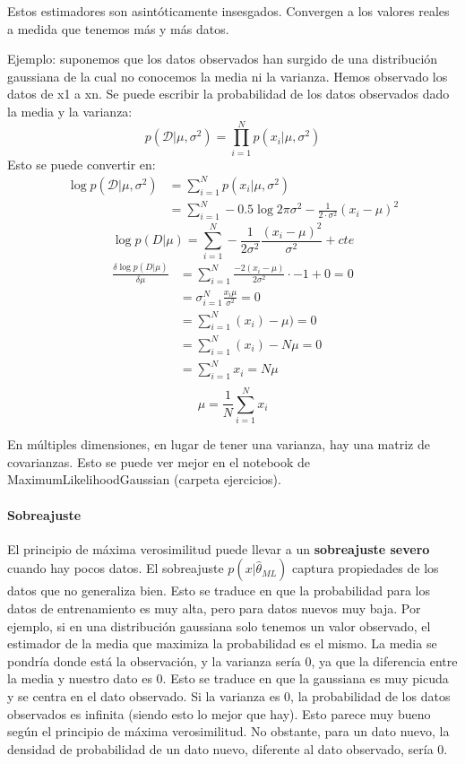 Estos estimadores son asintóticamente insesgados. Convergen a los valores reales a medida que tenemos más y más datos.

Ejemplo: suponemos que los datos observados han surgido de una distribución gaussiana de la cual no conocemos la media ni la varianza. Hemos observado los datos de x1 a xn. Se puede escribir la probabilidad de los datos observados dado la media y la varianza: 
$$p(\mathcal{D} | \mu, \sigma^2) = \prod^N_{i = 1} p(x_i | \mu, \sigma^2)$$
Esto se puede convertir en:
\begin{align*}
\log p(\mathcal{D} | \mu, \sigma^2) &= \sum^N_{i = 1} p(x_i | \mu, \sigma^2) \\
&= \sum^N_{i = 1} -0.5 \log 2 \pi \sigma^2 - \frac{1}{2 \cdot \sigma^2} (x_i - \mu)^2
\end{align*}
$$\log p(D|\mu) = \sum^N_{i = 1} - \frac{1}{2 \sigma^2} \frac{(x_i - \mu)^2}{\sigma^2} + cte$$
\begin{align*}
\frac{\delta \log p(D|\mu)}{\delta \mu} &= \sum^N_{i=1} \frac{-2(x_i - \mu)}{2 \sigma^2} \cdot -1 + 0 = 0 \\
&= \sigma^N_{i=1} \frac{x_i  \mu}{\sigma^2} = 0 \\
&= \sum^N_{i=1} (x_i) - \mu) = 0 \\
&= \sum^N_{i=1}(x_i) - N \mu = 0 \\
&= \sum^N_{i = 1} x_i = N \mu \\
\end{align*}
$$\mu = \frac{1}{N} \sum^N_{i=1} x_i$$

En múltiples dimensiones, en lugar de tener una varianza, hay una matriz de covarianzas. Esto se puede ver mejor en el notebook de MaximumLikelihoodGaussian (carpeta ejercicios).

\paragraph{Sobreajuste}
El principio de máxima verosimilitud puede llevar a un \textbf{sobreajuste severo} cuando hay pocos datos. El sobreajuste $p(x|\hat{\theta}_{ML})$ captura propiedades de los datos que no generaliza bien. Esto se traduce en que la probabilidad para los datos de entrenamiento es muy alta, pero para datos nuevos muy baja. Por ejemplo, si en una distribución gaussiana solo tenemos un valor observado, el estimador de la media que maximiza la probabilidad es el mismo. La media se pondría donde está la observación, y la varianza sería 0, ya que la diferencia entre la media y nuestro dato es 0. Esto se traduce en que la gaussiana es muy picuda y se centra en el dato observado. Si la varianza es 0, la probabilidad de los datos observados es infinita (siendo esto lo mejor que hay). Esto parece muy bueno según el principio de máxima verosimilitud. No obstante, para un dato nuevo, la densidad de probabilidad de un dato nuevo, diferente al dato observado, sería 0. 

